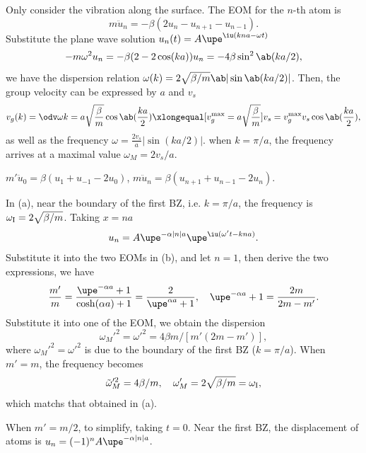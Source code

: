 \begin{solution}\leavevmode
  \begin{enumext}[label = (\alph*)]
    \item Only consider the vibration along the surface.
    The EOM for the $n$-th atom is
    \[
      m\ddot u_n = -\beta(2u_n - u_{n+1} - u_{n-1}).
    \]
    Substitute the plane wave
    solution $u_n(t) = A\upe^{\iu(kna-\omega t)}$
    \[  
      -m\omega^2u_n = -\beta(2 - 2\cos(ka))u_n = -4\beta\sin^2\ab(ka/2),
    \]
    we have the dispersion relation
    $\omega(k) = 2\sqrt{\beta/m}\ab|\sin\ab(ka/2)|$.
    Then, the group velocity can be expressed by $a$ and $v_s$
    \[
      v_g(k) = \odv\omega k = a\sqrt{\frac\beta m} \cos\ab(\frac{ka}{2})
      \xlongequal[v_g^{\max} = a\sqrt{\frac\beta m}]{v_s = v_g^{\max}}
      v_s\cos\ab(\frac{ka}{2}),
    \]
    as well as the frequency $\omega = \frac{2v_s}a |\sin(ka/2)|$.
    when $k = \pi/a$, the frequency arrives at a maximal
    value $\omega_M = 2v_s/a$.
    \item $m'\ddot u_0 = \beta(u_1 + u_{-1} - 2u_0)$,
          $m \ddot u_n = \beta(u_{n+1} + u_{n-1} - 2u_n)$.
    \item In (a), near the boundary of the first BZ, i.e. $k = \pi/a$,
    the frequency is $\omega_\text I = 2\sqrt{\beta/m}$.
    Taking $x = na$
    \[
      u_n = A \upe^{-\alpha|n|a} \upe^{\iu(\omega't - kna)}.
    \]
    Substitute it into the two EOMs in (b), and let $n = 1$,
    then derive the two expressions, we have
    \[
      \frac{m'}{m} = \frac{\upe^{-\alpha a} + 1}{\cosh(\alpha a) + 1}
    = \frac2{\upe^{\alpha a} + 1}, \quad
      \upe^{-\alpha a} + 1 = \frac{2m}{2m - m'}.
    \]
    Substitute it into one of the EOM, we obtain the dispersion
    \[
      \omega_M'^2 = \omega'^2 = 4\beta m/[m'(2m - m')],
    \]
    where $\omega_M'^2 = \omega'^2$ is due to the boundary of the first BZ
    ($k = \pi/a$). When $m' = m$, the frequency becomes
    \[
      \tilde \omega_M'^2 = 4\beta/m, \quad
      \omega_M' = 2\sqrt{\beta/m} = \omega_\text I,
    \]
    which matchs that obtained in (a).
    \item When $m' = m/2$, to simplify, taking $t = 0$. Near the first BZ,
    the displacement of atoms is $u_n = (-1)^n A\upe^{-\alpha|n|a}$.
  \end{enumext}
\end{solution}

